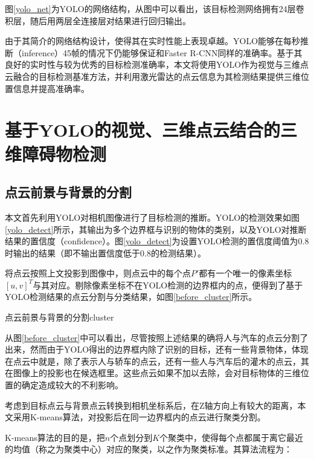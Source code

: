 
图\ref{yolo_net}为YOLO的网络结构，从图中可以看出，该目标检测网络拥有24层卷积层，随后用两层全连接层对结果进行回归输出。

由于其简介的网络结构设计，使得其在实时性能上表现卓越。YOLO能够在每秒推断（inference）45帧的情况下仍能够保证和Faster R-CNN同样的准确率。基于其良好的实时性与较为优秀的目标检测准确率，本文将使用YOLO作为视觉与三维点云融合的目标检测基准方法，并利用激光雷达的点云信息为其检测结果提供三维位置信息并提高准确率。

\section{基于YOLO的视觉、三维点云结合的三维障碍物检测}


\subsection{点云前景与背景的分割}
本文首先利用YOLO对相机图像进行了目标检测的推断。YOLO的检测效果如图\ref{yolo_detect}所示，其输出为多个边界框与识别的物体的类别，以及YOLO对推断结果的置信度（confidence）。图\ref{yolo_detect}为设置YOLO检测的置信度阈值为0.8时输出的结果（即不输出置信度低于0.8的检测结果）。

将点云按照上文投影到图像中，则点云中的每个点$P'$都有一个唯一的像素坐标$[u,v]^T$与其对应。剔除像素坐标不在YOLO检测的边界框内的点，便得到了基于YOLO检测结果的点云分割与分类结果，如图\ref{before_cluster}所示。
\begin{pics}[htbp]{点云前景与背景的分割}{cluster}
\end{pics}

从图\ref{before_cluster}中可以看出，尽管按照上述结果的确将人与汽车的点云分割了出来，然而由于YOLO得出的边界框内除了识别的目标，还有一些背景物体，体现在点云中就是，除了表示人与轿车的点云，还有一些人与汽车后的灌木的点云，其在图像上的投影也在候选框里。这些点云如果不加以去除，会对目标物体的三维位置的确定造成较大的不利影响。

考虑到目标点云与背景点云转换到相机坐标系后，在Z轴方向上有较大的距离，本文采用K-means算法，对投影后在同一边界框内的点云进行聚类分割。

K-means算法的目的是，把$n$个点划分到$K$个聚类中，使得每个点都属于离它最近的均值（称之为聚类中心）对应的聚类，以之作为聚类标准。其算法流程为：


